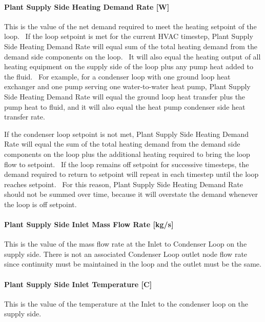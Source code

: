 \paragraph{Plant Supply Side Heating Demand Rate {[}W{]}}\label{plant-supply-side-heating-demand-rate-w-1}

This is the value of the net demand required to meet the heating setpoint of the loop.~ If the loop setpoint is met for the current HVAC timestep, Plant Supply Side Heating Demand Rate will equal sum of the total heating demand from the demand side components on the loop.~ It will also equal the heating output of all heating equipment on the supply side of the loop plus any pump heat added to the fluid.~ For example, for a condenser loop with one ground loop heat exchanger and one pump serving one water-to-water heat pump, Plant Supply Side Heating Demand Rate will equal the ground loop heat transfer plus the pump heat to fluid, and it will also equal the heat pump condenser side heat transfer rate.

If the condenser loop setpoint is not met, Plant Supply Side Heating Demand Rate will equal the sum of the total heating demand from the demand side components on the loop plus the additional heating required to bring the loop flow to setpoint.~ If the loop remains off setpoint for successive timesteps, the demand required to return to setpoint will repeat in each timestep until the loop reaches setpoint.~ For this reason, Plant Supply Side Heating Demand Rate should not be summed over time, because it will overstate the demand whenever the loop is off setpoint.

\paragraph{Plant Supply Side Inlet Mass Flow Rate {[}kg/s{]}}\label{plant-supply-side-inlet-mass-flow-rate-kgs-1}

This is the value of the mass flow rate at the Inlet to Condenser Loop on the supply side. There is not an associated Condenser Loop outlet node flow rate since continuity must be maintained in the loop and the outlet must be the same.

\paragraph{Plant Supply Side Inlet Temperature {[}C{]}}\label{plant-supply-side-inlet-temperature-c-1}

This is the value of the temperature at the Inlet to the condenser loop on the supply side.

